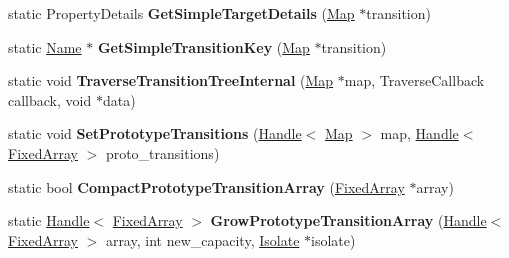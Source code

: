 \begin{DoxyCompactItemize}
\item 
static Property\+Details {\bfseries Get\+Simple\+Target\+Details} (\hyperlink{classv8_1_1internal_1_1_map}{Map} $\ast$transition)\hypertarget{classv8_1_1internal_1_1_transition_array_af174b35d368b2dc9c45373022ffba854}{}\label{classv8_1_1internal_1_1_transition_array_af174b35d368b2dc9c45373022ffba854}

\item 
static \hyperlink{classv8_1_1internal_1_1_name}{Name} $\ast$ {\bfseries Get\+Simple\+Transition\+Key} (\hyperlink{classv8_1_1internal_1_1_map}{Map} $\ast$transition)\hypertarget{classv8_1_1internal_1_1_transition_array_a8967b05837f42742c02ff51752ab51da}{}\label{classv8_1_1internal_1_1_transition_array_a8967b05837f42742c02ff51752ab51da}

\item 
static void {\bfseries Traverse\+Transition\+Tree\+Internal} (\hyperlink{classv8_1_1internal_1_1_map}{Map} $\ast$map, Traverse\+Callback callback, void $\ast$data)\hypertarget{classv8_1_1internal_1_1_transition_array_a1121b009ee6ab7c512b2fc5096fc1027}{}\label{classv8_1_1internal_1_1_transition_array_a1121b009ee6ab7c512b2fc5096fc1027}

\item 
static void {\bfseries Set\+Prototype\+Transitions} (\hyperlink{classv8_1_1internal_1_1_handle}{Handle}$<$ \hyperlink{classv8_1_1internal_1_1_map}{Map} $>$ map, \hyperlink{classv8_1_1internal_1_1_handle}{Handle}$<$ \hyperlink{classv8_1_1internal_1_1_fixed_array}{Fixed\+Array} $>$ proto\+\_\+transitions)\hypertarget{classv8_1_1internal_1_1_transition_array_a3c90c40a08f294a55f7de1045abe6a29}{}\label{classv8_1_1internal_1_1_transition_array_a3c90c40a08f294a55f7de1045abe6a29}

\item 
static bool {\bfseries Compact\+Prototype\+Transition\+Array} (\hyperlink{classv8_1_1internal_1_1_fixed_array}{Fixed\+Array} $\ast$array)\hypertarget{classv8_1_1internal_1_1_transition_array_ad815e4aedfacd8ac5550a8b05c164088}{}\label{classv8_1_1internal_1_1_transition_array_ad815e4aedfacd8ac5550a8b05c164088}

\item 
static \hyperlink{classv8_1_1internal_1_1_handle}{Handle}$<$ \hyperlink{classv8_1_1internal_1_1_fixed_array}{Fixed\+Array} $>$ {\bfseries Grow\+Prototype\+Transition\+Array} (\hyperlink{classv8_1_1internal_1_1_handle}{Handle}$<$ \hyperlink{classv8_1_1internal_1_1_fixed_array}{Fixed\+Array} $>$ array, int new\+\_\+capacity, \hyperlink{classv8_1_1internal_1_1_isolate}{Isolate} $\ast$isolate)\hypertarget{classv8_1_1internal_1_1_transition_array_a6d66184d1806af321a80227a610a5653}{}\label{classv8_1_1internal_1_1_transition_array_a6d66184d1806af321a80227a610a5653}


\end{DoxyCompactItemize}
